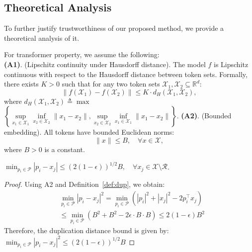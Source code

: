\subsection{Theoretical Analysis}
To further justify trustworthiness of our proposed method, we provide a theoretical analysis of it.
\begin{assumption}\label{assump:transformer} For transformer property, we assume the following: \\
\noindent \textbf{(A1)}. (Lipschitz continuity under Hausdorff distance). The model $f$ is Lipschitz continuous with respect to the Hausdorff distance between token sets. Formally, there exists $K > 0$ such that for any two token sets $\mathcal{X}_1, \mathcal{X}_2 \subseteq \mathbb{R}^d$:
    $$
    \|f(\mathcal{X}_1) - f(\mathcal{X}_2)\| \leq K \cdot d_H(\mathcal{X}_1, \mathcal{X}_2),
    $$
    where $d_H(\mathcal{X}_1, \mathcal{X}_2) \triangleq \max$\\ $\left\{\sup\limits_{x_1 \in \mathcal{X}_1} \inf\limits_{x_2 \in \mathcal{X}_2} \|x_1 - x_2\|, \sup\limits_{x_2 \in \mathcal{X}_2} \inf\limits_{x_1 \in \mathcal{X}_1} \|x_1 - x_2\|\right\}$.
\noindent \textbf{(A2)}. (Bounded embedding). All tokens have bounded Euclidean norms:
    $$
    \|x\| \leq B, \quad \forall x \in \mathcal{X},
    $$
    where $B > 0$ is a constant.
\end{assumption}
\begin{lemma}\label{lemma:cosine} $\min_{p_i\in \mathcal{P}} |p_i-x_j|\leq (2(1-\epsilon))^{1/2}B,\quad \forall x_j\in \mathcal{X}\setminus \mathcal{R}$.
\end{lemma}
\begin{proof} Using A2 and Definition~\ref{def:dup}, we obtain:
\begin{equation*}
    \begin{aligned}
        & \min_{p_i\in \mathcal{P}} |p_i-x_j|^2  = \min_{p_i\in \mathcal{P}} (|p_i|^2 + |x_j|^2 - 2 p_i^\top x_j) \\
        & \leq \min_{p_i\in \mathcal{P}} (B^2 + B^2 - 2 \epsilon \cdot B \cdot B) \leq 2(1-\epsilon) B^2
    \end{aligned}
\end{equation*}
Therefore, the duplication distance bound is given by:
$\min_{p_i\in \mathcal{P}} |p_i-x_j|^2\leq (2(1-\epsilon))^{1/2}B$
\end{proof}
\vspace{-2mm}
